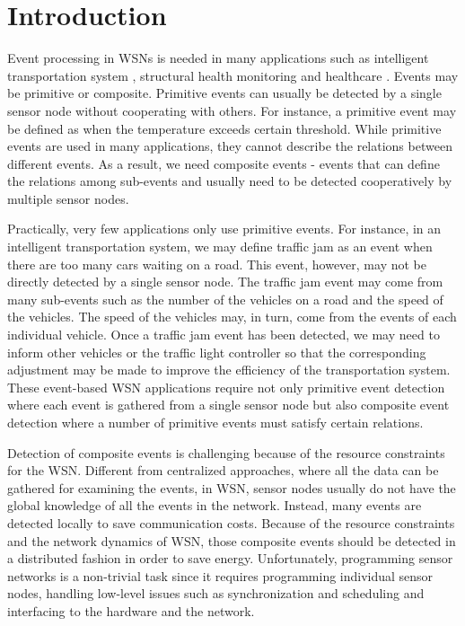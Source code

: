 \section{Introduction}
\label{sec:introduction}
Event processing \cite{jector} in WSNs is needed in many applications such as intelligent transportation system \cite{klein:its}, structural health monitoring \cite{lynch:shm} and healthcare \cite{lo:ban}. Events may be primitive or composite. Primitive events can usually be detected by a single sensor node without cooperating with others. For instance, a primitive event may be defined as when the temperature exceeds certain threshold. While primitive events are used in many applications, they cannot describe the relations between different events. As a result, we need composite events - events that can define the relations among sub-events and usually need to be detected cooperatively by multiple sensor nodes.

Practically, very few applications only use primitive events. For instance, in an intelligent transportation system, we may define traffic jam as an event when there are too many cars waiting on a road. This event, however, may not be directly detected by a single sensor node. The traffic jam event may come from many sub-events such as the number of the vehicles on a road and the speed of the vehicles. The speed of the vehicles may, in turn, come from the events of each individual vehicle. Once a traffic jam event has been detected, we may need to inform other vehicles or the traffic light controller so that the corresponding adjustment may be made to improve the efficiency of the transportation system. These event-based WSN applications require not only primitive event detection where each event is gathered from a single sensor node but also composite event detection where a number of primitive events must satisfy certain relations.

Detection of composite events is challenging because of the resource constraints for the WSN. Different from centralized approaches, where all the data can be gathered for examining the events, in WSN, sensor nodes usually do not have the global knowledge of all the events in the network. Instead, many events are detected locally to save communication costs. Because of the resource constraints and the network dynamics of WSN, those composite events should be detected in a distributed fashion in order to save energy. Unfortunately, programming sensor networks is a non-trivial task since it requires programming individual sensor nodes, handling low-level issues such as synchronization and scheduling and interfacing to the hardware and the network.

